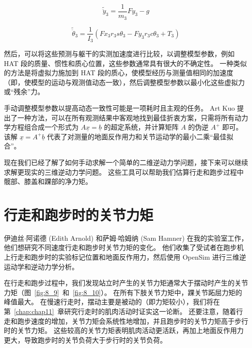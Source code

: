 \begin{equation}
	\tilde{\ddot{y}}_3  =  \frac{1}{m_3} F y_3 - g
	\label{eq:8_16b}
\end{equation}

\begin{equation}
	\tilde{\ddot{\theta}}_3 = 
		\frac{1}{I_3}
		(
			F x_3 r_3 s \theta_3 - 
			F y_3 r_3 c \theta_3 + 
			T_3
		)
	\label{eq:8_16c}
\end{equation}


然后，可以将这些预测与躯干的实测加速度进行比较，以调整模型参数，例如 HAT 段的质量、惯性和质心位置，这些参数通常具有很大的不确定性。
一种类似的方法是将虚拟力施加到 HAT 段的质心，使模型经历与测量值相同的加速度（即，使模型的运动与观测值动态一致），然后调整模型参数以最小化这些虚拟力或“残余”力。


手动调整模型参数以提高动态一致性可能是一项耗时且主观的任务。
Art Kuo 提出了一种方法，可以在所有观测结果中客观地找到最佳折衷方案，只需将所有动力学方程组合成一个形式为 $A \underline{x} = \underline{b}$ 的超定系统，并计算矩阵 $A$ 的伪逆 $A^{+}$ 即可。
该解 $\underline{x} = A^{+} \underline{b}$ 代表了对测量的地面反作用力和关节运动学的最小二乘“最佳拟合”\cite{kuo1998least}。


现在我们已经了解了如何手动求解一个简单的二维逆动力学问题，接下来可以继续求解更现实的三维逆动力学问题。
这些工具可以帮助我们估算行走和跑步过程中髋部、膝盖和踝部的净力矩。



\section{行走和跑步时的关节力矩}

伊迪丝$\cdot$阿诺德 (Edith Arnold) 和萨姆$\cdot$哈姆纳 (Sam Hamner) 在我的实验室工作，他们想研究不同速度行走和跑步时关节力矩的变化。
他们收集了受试者在跑步机上行走和跑步时的实验标记位置和地面反作用力，然后使用 OpenSim 进行三维逆运动学和逆动力学分析。


在行走和跑步过程中，我们发现站立时产生的关节力矩通常大于摆动时产生的关节力矩（图~\ref{fig:8_9}~和~\ref{fig:8_10}）。
在所有下肢关节力矩中，踝关节跖屈力矩的峰值最大。
在慢速行走时，摆动主要是被动的（即力矩较小），我们将在第~\ref{chap:chap11}~章研究行走时的肌肉活动时证实这一论断。
还要注意，随着行走和跑步速度的增加，关节力矩会系统性地增加，并且跑步时的关节力矩高于步行时的关节力矩。
这些较高的关节力矩表明肌肉活动更活跃，再加上地面反作用力更大，导致跑步时的关节负荷大于步行时的关节负荷。



